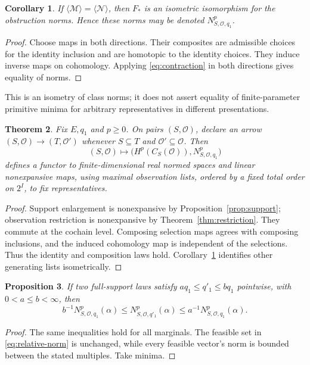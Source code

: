 \documentclass[11pt,a4paper]{article}
\numberwithin{equation}{section}
\newtheorem{theorem}{Theorem}[section]
\newtheorem{proposition}[theorem]{Proposition}
\newtheorem{corollary}[theorem]{Corollary}
\theoremstyle{remark}
\newcommand{\M}{\mathcal M}
\newcommand{\OO}{\mathcal O}
\begin{document}
\begin{corollary}\label{cor:list}
If $\langle\M\rangle=\langle\mathcal N\rangle$, then $F_*$ is an isometric isomorphism for the obstruction norms. Hence these norms may be denoted $N^p_{S,\OO,q_1}$.
\end{corollary}
\begin{proof}
Choose maps in both directions. Their composites are admissible choices for the identity inclusion and are homotopic to the identity choices. They induce inverse maps on cohomology. Applying \eqref{eq:contraction} in both directions gives equality of norms.
\end{proof}
This is an isometry of class norms; it does not assert equality of finite-parameter primitive minima for arbitrary representatives in different presentations.

\begin{theorem}\label{thm:functor}
Fix $E,q_1$ and $p\ge0$. On pairs $(S,\OO)$, declare an arrow $(S,\OO)\to(T,\OO')$ whenever $S\subseteq T$ and $\OO'\subseteq\OO$. Then
\[
 (S,\OO)\longmapsto\bigl(H^p(C_S(\OO)),N^p_{S,\OO,q_1}\bigr)
\]
defines a functor to finite-dimensional real normed spaces and linear nonexpansive maps, using maximal observation lists, ordered by a fixed total order on $2^I$, to fix representatives.
\end{theorem}
\begin{proof}
Support enlargement is nonexpansive by Proposition~\ref{prop:support}; observation restriction is nonexpansive by Theorem~\ref{thm:restriction}. They commute at the cochain level. Composing selection maps agrees with composing inclusions, and the induced cohomology map is independent of the selections. Thus the identity and composition laws hold. Corollary~\ref{cor:list} identifies other generating lists isometrically.
\end{proof}

\begin{proposition}\label{prop:reference}
If two full-support laws satisfy $a q_1\le q'_1\le b q_1$ pointwise, with $0<a\le b<\infty$, then
\[
 b^{-1}N^p_{S,\OO,q_1}(\alpha)
 \le N^p_{S,\OO,q'_1}(\alpha)
 \le a^{-1}N^p_{S,\OO,q_1}(\alpha).
\]
\end{proposition}
\begin{proof}
The same inequalities hold for all marginals. The feasible set in \eqref{eq:relative-norm} is unchanged, while every feasible vector's norm is bounded between the stated multiples. Take minima.
\end{proof}
\end{document}
